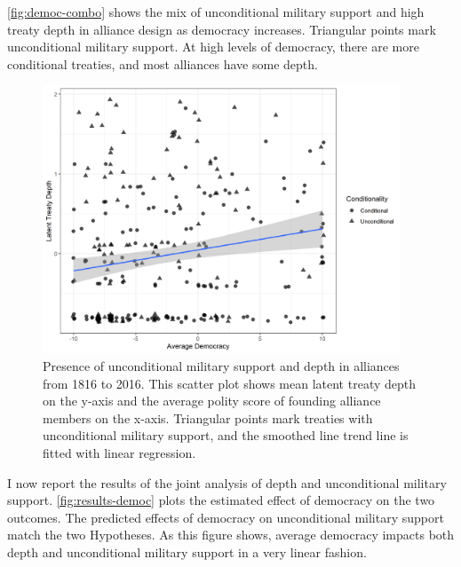 \documentclass[12pt]{article}
\begin{document}
\autoref{fig:democ-combo} shows the mix of unconditional military support and high treaty depth in alliance design as democracy increases. 
Triangular points mark unconditional military support. 
At high levels of democracy, there are more conditional treaties, and most alliances have some depth. 


\begin{figure}[hbtp]
\centering
\includegraphics[width=0.95\textwidth]{../figures/democ-combo.png}
\caption{Presence of unconditional military support and depth in alliances from 1816 to 2016. This scatter plot shows mean latent treaty depth on the y-axis and the average polity score of founding alliance members on the x-axis. Triangular points mark treaties with unconditional military support, and the smoothed line trend line is fitted with linear regression. }
\label{fig:democ-combo}
\end{figure}


I now report the results of the joint analysis of depth and unconditional military support. 
\autoref{fig:results-democ} plots the estimated effect of democracy on the two outcomes. 
The predicted effects of democracy on unconditional military support match the two Hypotheses. 
As this figure shows, average democracy impacts both depth and unconditional military support in a very linear fashion. 
\end{document}
